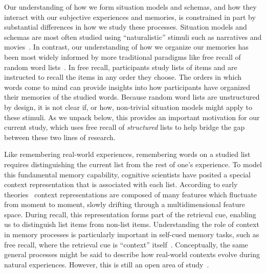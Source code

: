 \documentclass[11pt]{article}
\begin{document}

Our understanding of how we form situation models and schemas, and how they
interact with our subjective experiences and memories, is constrained in part
by substantial differences in how we study these processes. Situation models
and schemas are most often studied using ``naturalistic'' stimuli such as
narratives and movies~\citep{ZwaaEtal95,ZwaaRadv98, NastEtal20}. In contrast,
our understanding of how we organize our memories has been most widely informed
by more traditional paradigms like free recall of random word
lists~\citep{Kaha12, Kaha20}. In free recall, participants study lists of items
and are instructed to recall the items in any order they choose. The orders in
which words come to mind can provide insights into how participants have
organized their memories of the studied words. Because random word lists are
unstructured by design, it is not clear if, or how, non-trivial situation
models might apply to these stimuli. As we unpack below, this provides an
important motivation for our current study, which uses free recall of
\textit{structured} lists to help bridge the gap between these two lines of
research.

Like remembering real-world experiences, remembering words on a studied list
requires distinguishing the current list from the rest of one's experience. To
model this fundamental memory capability, cognitive scientists have posited a
special context representation that is associated with each list. According to
early theories~\citep[e.g.][]{Este55a,AndeBowe72} context representations are
composed of many features which fluctuate from moment to moment, slowly
drifting through a multidimensional feature space. During recall, this
representation forms part of the retrieval cue, enabling us to distinguish list
items from non-list items. Understanding the role of context in memory
processes is particularly important in self-cued memory tasks, such as free
recall, where the retrieval cue is ``context'' itself~\citep{HowaKaha02a}.
Conceptually, the same general processes might be said to describe how
real-world contexts evolve during natural experiences. However, this is still
an open area of study~\citep{Mann20, Mann21a}.
\end{document}

